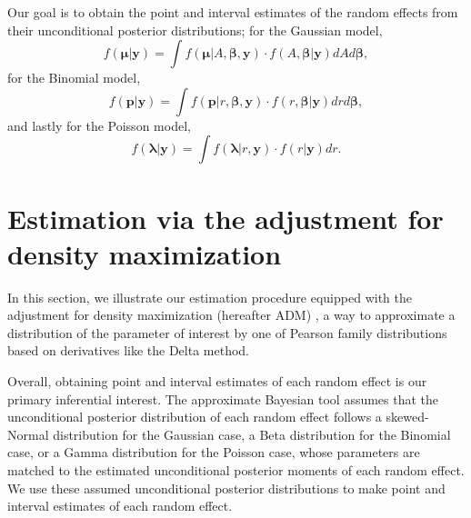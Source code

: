 \documentclass[article]{jss}
\begin{document}

Our goal is to obtain the point and interval estimates of the random effects from their unconditional posterior distributions; for the Gaussian  model, 
\begin{equation}\label{mcintegration_normal}
f(\boldsymbol{\mu}\vert \boldsymbol{y})=\int  f(\boldsymbol{\mu}\vert A, \boldsymbol{\beta}, \boldsymbol{y})\cdot f(A, \boldsymbol{\beta}\vert \boldsymbol{y})dA d\boldsymbol{\beta},
\end{equation}
for the Binomial  model, 
\begin{equation}\label{mcintegration_binomial}
f(\boldsymbol{p}\vert \boldsymbol{y})=\int  f(\boldsymbol{p}\vert r, \boldsymbol{\beta}, \boldsymbol{y})\cdot f(r, \boldsymbol{\beta}\vert \boldsymbol{y})dr d\boldsymbol{\beta},
\end{equation}
and lastly for the Poisson  model, 
\begin{equation}\label{mcintegration_poisson}
f(\boldsymbol{\lambda}\vert \boldsymbol{y})=\int  f(\boldsymbol{\lambda}\vert r, \boldsymbol{y})\cdot f(r\vert \boldsymbol{y})dr.
\end{equation}



\section[Estimation]{Estimation via the adjustment for density maximization}\label{sec3}

In this section, we illustrate our estimation procedure equipped with the adjustment for density maximization (hereafter ADM) \citep{carl1988, morris1997, tang2011}, a way to  approximate a distribution of the parameter of interest by one of Pearson family distributions based on derivatives like the Delta method. %


Overall, obtaining point and interval estimates of each random effect is our primary inferential interest.  The approximate Bayesian tool assumes that the unconditional posterior distribution of each random effect follows a skewed-Normal distribution for the Gaussian case,  a Beta distribution for the Binomial case, or a Gamma distribution for the Poisson case, whose parameters are matched to the estimated unconditional posterior moments of each random effect. We use these assumed unconditional posterior distributions to make point and interval estimates of each random effect. 
\end{document}
